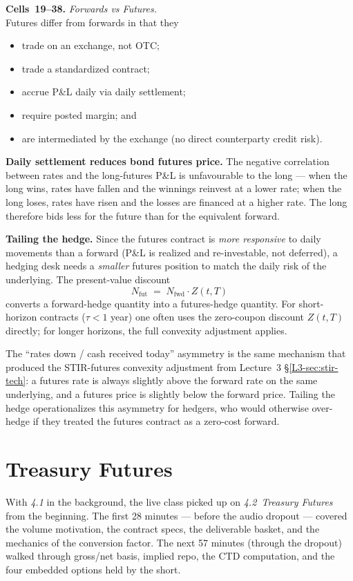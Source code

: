 \begin{keyblock}
\textbf{Cells~19--38.} \emph{Forwards vs Futures.}\\
Futures differ from forwards in that they
\begin{itemize}
  \item trade on an exchange, not OTC;
  \item trade a standardized contract;
  \item accrue P\&L daily via daily settlement;
  \item require posted margin; and
  \item are intermediated by the exchange (no direct counterparty credit risk).
\end{itemize}
\textbf{Daily settlement reduces bond futures price.} The negative
correlation between rates and the long-futures P\&L is unfavourable to the
long --- when the long wins, rates have fallen and the winnings reinvest at
a lower rate; when the long loses, rates have risen and the losses are
financed at a higher rate. The long therefore bids less for the future
than for the equivalent forward.

\textbf{Tailing the hedge.} Since the futures contract is \emph{more
responsive} to daily movements than a forward (P\&L is realized and
re-investable, not deferred), a hedging desk needs a \emph{smaller} futures
position to match the daily risk of the underlying. The present-value
discount
\[
  N_{\text{fut}} \;=\; N_{\text{fwd}} \cdot Z(t,T)
\]
converts a forward-hedge quantity into a futures-hedge quantity. For
short-horizon contracts ($\tau < 1$ year) one often uses the zero-coupon
discount $Z(t,T)$ directly; for longer horizons, the full convexity
adjustment applies.
\end{keyblock}

The ``rates down / cash received today'' asymmetry is the same mechanism
that produced the STIR-futures convexity adjustment from Lecture~3
\S\ref{L3-sec:stir-tech}: a futures rate is always slightly above the
forward rate on the same underlying, and a futures price is slightly below
the forward price. Tailing the hedge operationalizes this asymmetry for
hedgers, who would otherwise over-hedge if they treated the futures
contract as a zero-cost forward.

\section{Treasury Futures}\label{L4-sec:tf}

With \emph{4.1} in the background, the live class picked up on
\emph{4.2~Treasury Futures} from the beginning. The first 28 minutes
--- before the audio dropout --- covered the volume motivation, the contract
specs, the deliverable basket, and the mechanics of the conversion factor.
The next 57 minutes (through the dropout) walked through gross/net basis,
implied repo, the CTD computation, and the four embedded options held by
the short.

